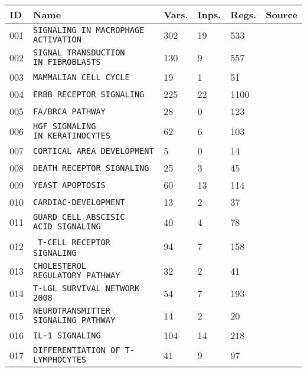 \documentclass{article}
\begin{document}
\begin{center}
	\begin{tabular}{ | C{16pt} | C{144pt} | C{25pt} | C{25pt} | C{25pt} | C{35pt} | }
		\hline
		ID & Name & Vars. & Inps. & Regs. & Source \\  & \texttt{SIGNALING IN MACROPHAGE ACTIVATION} & 302 & 19 & 533 & \cite{bbm-001, cell-collective} \\  & \texttt{SIGNAL TRANSDUCTION IN~FIBROBLASTS} & 130 & 9 & 557 & \cite{bbm-002, cell-collective} \\  & \texttt{MAMMALIAN CELL CYCLE} & 19 & 1 & 51 & \cite{bbm-003, cell-collective} \\  & \texttt{ERBB RECEPTOR SIGNALING} & 225 & 22 & 1100 & \cite{bbm-004, cell-collective}  \\  & \texttt{FA/BRCA PATHWAY} & 28 & 0 & 123 & \cite{bbm-005, cell-collective} \\  & \texttt{HGF SIGNALING IN~KERATINOCYTES} & 62 & 6 & 103 & \cite{bbm-006, cell-collective} \\  & \texttt{CORTICAL AREA DEVELOPMENT} & 5 & 0 & 14 & \cite{bbm-007, cell-collective} \\  & \texttt{DEATH RECEPTOR SIGNALING} & 25 & 3 & 45 & \cite{bbm-008-150, cell-collective} \\  & \texttt{YEAST APOPTOSIS} & 60 & 13 & 114 & \cite{bbm-009, cell-collective} \\  & \texttt{CARDIAC-DEVELOPMENT} & 13 & 2 & 37 & \cite{bbm-010, cell-collective} \\  & \texttt{GUARD CELL ABSCISIC ACID~SIGNALING} & 40 & 4 & 78 & \cite{bbm-011, cell-collective} \\  & \texttt{T-CELL RECEPTOR SIGNALING} & 94 & 7 & 158 & \cite{bbm-012, cell-collective} \\  & \texttt{CHOLESTEROL REGULATORY~PATHWAY} & 32 & 2 & 41 & \cite{bbm-013, cell-collective} \\  & \texttt{T-LGL SURVIVAL NETWORK 2008} & 54 & 7 & 193 & \cite{bbm-014, cell-collective} \\  & \texttt{NEUROTRANSMITTER SIGNALING~PATHWAY} & 14 & 2 & 20 & \cite{bbm-015, cell-collective} \\  & \texttt{IL-1 SIGNALING} & 104 & 14 & 218 & \cite{bbm-016-019, cell-collective} \\  & \texttt{DIFFERENTIATION OF T-LYMPHOCYTES}  & 41 & 9 & 97 & \cite{bbm-017, cell-collective} \\ \hline

\end{tabular}
\end{center}
\end{document}
